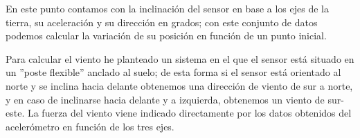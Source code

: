  En este punto contamos con la inclinación del sensor en base a los ejes de la tierra, su aceleración y su dirección en grados; con este conjunto de datos podemos calcular la variación de su posición en función de un punto inicial.
   
  Para calcular el viento he planteado un sistema en el que el sensor está situado en un ''poste flexible'' anclado al suelo; de esta forma si el sensor está orientado al norte y se inclina hacia delante obtenemos una dirección de viento de sur a norte, y en caso de inclinarse hacia delante y a izquierda, obtenemos un viento de sur-este. La fuerza del viento viene indicado directamente por los datos obtenidos del acelerómetro en función de los tres ejes.
  
  